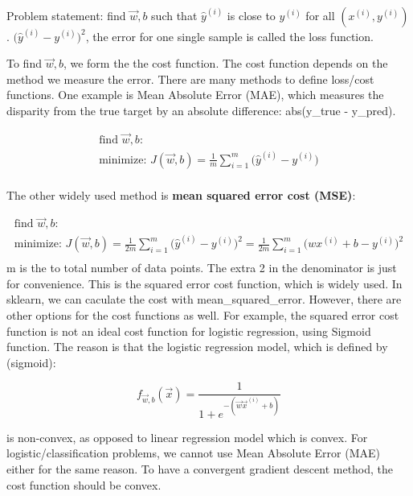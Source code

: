 \documentclass[12pt]{report}
\begin{document}
Problem statement: find $\overrightarrow{w},b$ such that $\hat{y}^{(i)}$ is close to $y^{(i)}$ for all $(x^{(i)}, y^{(i)} )$. $\big(\hat{y}^{(i)}  - y^{(i)} \big) ^2$, the error for one single sample is called the loss function.

To find $\overrightarrow{w},b$, we form the the cost function. The cost function depends on the method we measure the error. There are many methods to define loss/cost functions. One example is Mean Absolute Error (MAE), which measures the disparity from the true target by an absolute difference: abs(y\_true - y\_pred).

\begin{multline}
  \text{find $\overrightarrow{w},b$:} \\
  \text{minimize:  }  J(\overrightarrow{w},b) = \frac{1}{m} \sum_{i=1}^{m} \big(\hat{y}^{(i)}  - y^{(i)} \big) \\
\end{multline}


The other widely used method is \textbf{mean squared error cost (MSE)}:

\begin{multline}
	\text{find $\overrightarrow{w},b$:} \\
	\text{minimize:  }  J(\overrightarrow{w},b) = \frac{1}{2m} \sum_{i=1}^{m} \big(\hat{y}^{(i)}  - y^{(i)} \big) ^2 = \frac{1}{2m} \sum_{i=1}^{m} \big( wx ^ {(i)} + b - y^{(i)} \big) ^2 \\
\end{multline}
m is the to total number of data points. The extra 2 in the denominator is just for convenience. This is the squared error cost function, which is widely used. In sklearn, we can caculate the cost with mean\_squared\_error. However, there are other options for the cost functions as well. For example, the squared error cost function is not an ideal cost function for logistic regression, using Sigmoid function. The reason is that the logistic regression model, which is defined by (sigmoid):

\begin{equation}
  f_{\overrightarrow{w},b} (\overrightarrow{x}) = \frac{1}{1+e^{-(\overrightarrow{w} \overrightarrow{x} ^ {(i)} + b)}}
\end{equation}

is non-convex, as opposed to linear regression model which is convex. For logistic/classification problems, we cannot use Mean Absolute Error (MAE) either for the same reason. To have a convergent gradient descent method, the cost function should be convex.
\end{document}
